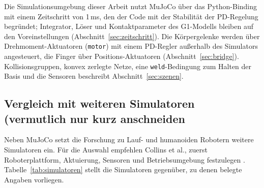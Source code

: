 Die Simulationsumgebung dieser Arbeit nutzt MuJoCo über das Python-Binding mit einem Zeitschritt von 1\,ms, den der Code mit der Stabilität der PD-Regelung begründet; Integrator, Löser und Kontaktparameter des G1-Modells bleiben auf den Voreinstellungen (Abschnitt~\ref{sec:zeitschritt}).
Die Körpergelenke werden über Drehmoment-Aktuatoren (\texttt{motor}) mit einem PD-Regler außerhalb des Simulators angesteuert, die Finger über Positions-Aktuatoren (Abschnitt~\ref{sec:bridge}).
Kollisionsgruppen, konvex zerlegte Netze, eine \texttt{weld}-Bedingung zum Halten der Basis und die Sensoren beschreibt Abschnitt~\ref{sec:szenen}.

\subsection{Vergleich mit weiteren Simulatoren (vermutlich nur kurz anschneiden}
\label{sec:sim_vergleich}
Neben MuJoCo setzt die Forschung zu Lauf- und humanoiden Robotern weitere Simulatoren ein.
Für die Auswahl empfehlen Collins et al., zuerst Roboterplattform, Aktuierung, Sensoren und Betriebsumgebung festzulegen \cite{Collins2021}.
Tabelle~\ref{tab:simulatoren} stellt die Simulatoren gegenüber, zu denen belegte Angaben vorliegen.

